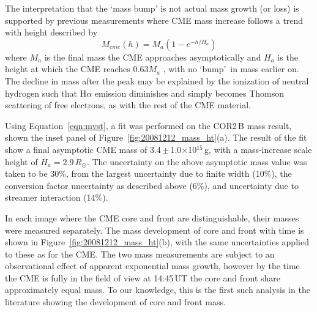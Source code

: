 The interpretation that the `mass bump' is not actual mass growth (or loss) is supported by previous measurements where CME mass increase follows a trend with height described by
\begin{equation}
M_{cme}(h)=M_{a}(1-e^{-h/H_a})
\label{eqn:mvst}
\end{equation}
where $M_a$ is the final mass the CME approaches asymptotically and $H_a$ is the height at which the CME reaches 0.63$M_a$ \citep{cola09}, with no `bump'~in mass earlier on. The decline in mass after the peak may be explained by the ionization of neutral hydrogen such that H$\alpha$ emission diminishes and simply becomes Thomson scattering of free electrons, as with the rest of the CME material. 

Using Equation~\ref{eqn:mvst}, a fit was performed on the COR2\,B mass result, shown the inset panel of Figure~\ref{fig:20081212_mass_ht}(a). The result of the fit show a final asymptotic CME mass of 3.4\,$\pm$\,1.0$\times$10$^{15}$\,g, with a mass-increase scale height of $H_a=2.9\,R_{\odot}$. The uncertainty on the above asymptotic mass value was taken to be 30\%, from the largest uncertainty due to finite width (10\%), the conversion factor uncertainty as described above (6\%), and uncertainty due to streamer interaction (14\%).


In each image where the CME core and front are distinguishable, their masses were measured separately. The mass development of core and front with time is shown in Figure~\ref{fig:20081212_mass_ht}(b), with the same uncertainties applied to these as for the CME. The two mass measurements are subject to an observational effect of apparent exponential mass growth, however by the time the CME is fully in the field of view at 14:45\,UT the core and front share approximately equal mass. To our knowledge, this is the first such analysis in the literature showing the development of core and front mass.


